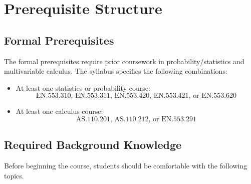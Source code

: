 \documentclass[11pt]{article}
\begin{document}
\section{Prerequisite Structure}

\subsection{Formal Prerequisites}

The formal prerequisites require prior coursework in probability/statistics and
multivariable calculus. The syllabus specifies the following combinations:

\begin{itemize}
    \item At least one statistics or probability course:
    \[
    \text{EN.553.310, EN.553.311, EN.553.420, EN.553.421, or EN.553.620}
    \]
    \item At least one calculus course:
    \[
    \text{AS.110.201, AS.110.212, or EN.553.291}
    \]
\end{itemize}

\subsection{Required Background Knowledge}

Before beginning the course, students should be comfortable with the following
topics.
\end{document}
